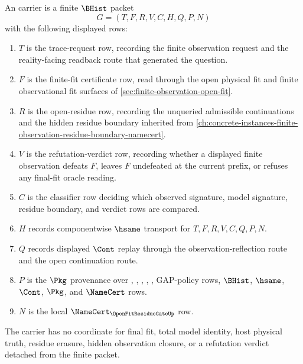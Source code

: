 \begin{definition}
\label{def:open-fit-residue-gate-carrier}
An \OpenFitResidueGateUp carrier is a finite $\BHist$ packet
$$
G=(T,F,R,V,C,H,Q,P,N)
$$
with the following displayed rows:
\begin{enumerate}
\item $T$ is the trace-request row, recording the finite observation request and the reality-facing readback route that generated the question.
\item $F$ is the finite-fit certificate row, read through the open physical fit and finite observational fit surfaces of \autoref{sec:finite-observation-open-fit}.
\item $R$ is the open-residue row, recording the unqueried admissible continuations and the hidden residue boundary inherited from \autoref{ch:concrete-instances-finite-observation-residue-boundary-namecert}.
\item $V$ is the refutation-verdict row, recording whether a displayed finite observation defeats $F$, leaves $F$ undefeated at the current prefix, or refuses any final-fit oracle reading.
\item $C$ is the classifier row deciding which observed signature, model signature, residue boundary, and verdict rows are compared.
\item $H$ records componentwise $\hsame$ transport for $T,F,R,V,C,Q,P,N$.
\item $Q$ records displayed $\Cont$ replay through the observation-reflection route and the open continuation route.
\item $P$ is the $\Pkg$ provenance over \OpenFitResidueGateUp, \OpenPhysicalFitUp, \RealityConstrainedOpenFitUp, \FiniteObservationResidueBoundaryUp, \ObservationReflectionPacketUp, GAP-policy rows, $\BHist$, $\hsame$, $\Cont$, $\Pkg$, and $\NameCert$ rows.
\item $N$ is the local $\NameCert_{\OpenFitResidueGateUp}$ row.
\end{enumerate}
The carrier has no coordinate for final fit, total model identity, host physical truth, residue erasure, hidden observation closure, or a refutation verdict detached from the finite packet.
\end{definition}

